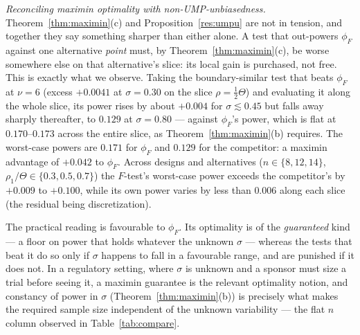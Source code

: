 \documentclass[11pt]{article}
\theoremstyle{remark}
\begin{document}
\emph{Reconciling maximin optimality with non-UMP-unbiasedness.} Theorem~\ref{thm:maximin}(c) and Proposition~\ref{res:umpu} are not in tension, and together they say something sharper than either alone. A test that out-powers $\phi_F$ against one alternative \emph{point} must, by Theorem~\ref{thm:maximin}(c), be worse somewhere else on that alternative's slice: its local gain is purchased, not free. This is exactly what we observe. Taking the boundary-similar test that beats $\phi_F$ at $\nu=6$ (excess $+0.0041$ at $\sigma=0.30$ on the slice $\rho=\tfrac12\Theta$) and evaluating it along the whole slice, its power rises by about $+0.004$ for $\sigma\lesssim 0.45$ but falls away sharply thereafter, to $0.129$ at $\sigma=0.80$ --- against $\phi_F$'s power, which is flat at $0.170$--$0.173$ across the entire slice, as Theorem~\ref{thm:maximin}(b) requires. The worst-case powers are $0.171$ for $\phi_F$ and $0.129$ for the competitor: a maximin advantage of $+0.042$ to $\phi_F$. Across designs and alternatives ($n\in\{8,12,14\}$, $\rho_1/\Theta\in\{0.3,0.5,0.7\}$) the $F$-test's worst-case power exceeds the competitor's by $+0.009$ to $+0.100$, while its own power varies by less than $0.006$ along each slice (the residual being discretization).

The practical reading is favourable to $\phi_F$. Its optimality is of the \emph{guaranteed} kind --- a floor on power that holds whatever the unknown $\sigma$ --- whereas the tests that beat it do so only if $\sigma$ happens to fall in a favourable range, and are punished if it does not. In a regulatory setting, where $\sigma$ is unknown and a sponsor must size a trial before seeing it, a maximin guarantee is the relevant optimality notion, and constancy of power in $\sigma$ (Theorem~\ref{thm:maximin}(b)) is precisely what makes the required sample size independent of the unknown variability --- the flat $n$ column observed in Table~\ref{tab:compare}.
\end{document}
